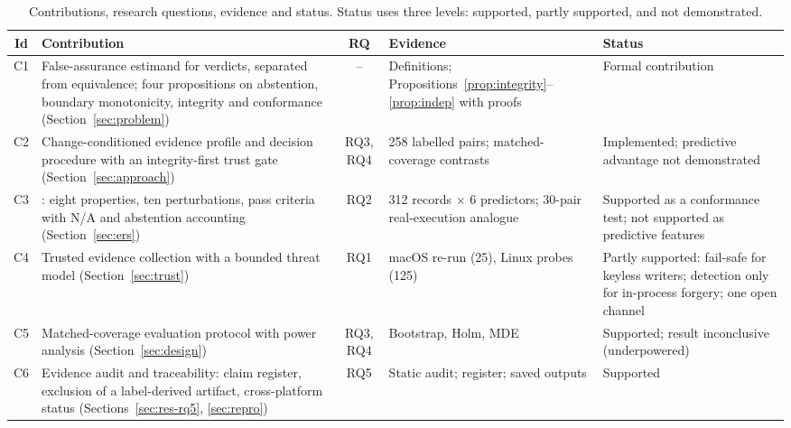 \begin{table}[!t]
\caption{Contributions, research questions, evidence and status. Status uses three levels: supported, partly supported, and not demonstrated.}
\label{tab:contrib}
\centering
\scriptsize
\setlength{\tabcolsep}{3pt}
\begin{tabular}{|c|L{4.2cm}|c|L{4.6cm}|L{4.0cm}|}
\hline
Id & Contribution & RQ & Evidence & Status \\
\hline
C1 & False-assurance estimand for \NDO{} verdicts, separated from equivalence; four propositions on abstention, boundary monotonicity, integrity and conformance (Section~\ref{sec:problem}) & -- & Definitions; Propositions~\ref{prop:integrity}--\ref{prop:indep} with proofs & Formal contribution \\
C2 & Change-conditioned evidence profile and \cec{} decision procedure with an integrity-first trust gate (Section~\ref{sec:approach}) & RQ3, RQ4 & 258 labelled pairs; matched-coverage contrasts & Implemented; predictive advantage not demonstrated \\
C3 & \ers{}: eight properties, ten perturbations, pass criteria with N/A and abstention accounting (Section~\ref{sec:ers}) & RQ2 & 312 records $\times$ 6 predictors; 30-pair real-execution analogue & Supported as a conformance test; not supported as predictive features \\
C4 & Trusted evidence collection with a bounded threat model (Section~\ref{sec:trust}) & RQ1 & macOS re-run (25), Linux probes (125) & Partly supported: fail-safe for keyless writers; detection only for in-process forgery; one open channel \\
C5 & Matched-coverage evaluation protocol with power analysis (Section~\ref{sec:design}) & RQ3, RQ4 & Bootstrap, Holm, MDE & Supported; result inconclusive (underpowered) \\
C6 & Evidence audit and traceability: claim register, exclusion of a label-derived artifact, cross-platform status (Sections~\ref{sec:res-rq5}, \ref{sec:repro}) & RQ5 & Static audit; register; saved outputs & Supported \\
\hline
\end{tabular}
\end{table}

